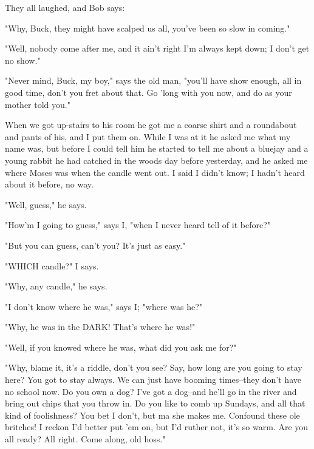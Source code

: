 They all laughed, and Bob says:

"Why, Buck, they might have scalped us all, you've been so slow in
coming."

"Well, nobody come after me, and it ain't right I'm always kept down; I
don't get no show."

"Never mind, Buck, my boy," says the old man, "you'll have show enough,
all in good time, don't you fret about that.  Go 'long with you now, and
do as your mother told you."

When we got up-stairs to his room he got me a coarse shirt and a
roundabout and pants of his, and I put them on.  While I was at it he
asked me what my name was, but before I could tell him he started to tell
me about a bluejay and a young rabbit he had catched in the woods day
before yesterday, and he asked me where Moses was when the candle went
out.  I said I didn't know; I hadn't heard about it before, no way.

"Well, guess," he says.

"How'm I going to guess," says I, "when I never heard tell of it before?"

"But you can guess, can't you?  It's just as easy."

"WHICH candle?"  I says.

"Why, any candle," he says.

"I don't know where he was," says I; "where was he?"

"Why, he was in the DARK!  That's where he was!"

"Well, if you knowed where he was, what did you ask me for?"

"Why, blame it, it's a riddle, don't you see?  Say, how long are you
going to stay here?  You got to stay always.  We can just have booming
times--they don't have no school now.  Do you own a dog?  I've got a
dog--and he'll go in the river and bring out chips that you throw in.  Do
you like to comb up Sundays, and all that kind of foolishness?  You bet I
don't, but ma she makes me.  Confound these ole britches!  I reckon I'd
better put 'em on, but I'd ruther not, it's so warm.  Are you all ready?
All right.  Come along, old hoss."

